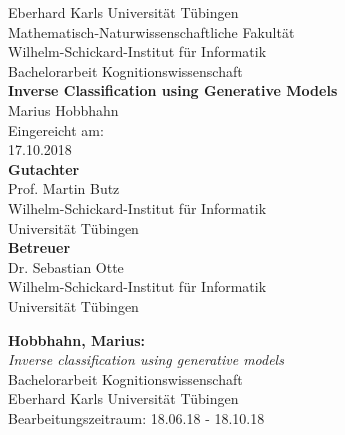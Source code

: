 



\begin{titlepage}

\begin{center}
	\LARGE Eberhard Karls Universität Tübingen\\
	\large Mathematisch-Naturwissenschaftliche Fakultät \\
	Wilhelm-Schickard-Institut für Informatik\\
	[3cm]
	\huge Bachelorarbeit Kognitionswissenschaft\\
	[2cm]
	\Large\textbf{Inverse Classification using Generative Models}\\
	[1.5cm]
	\large Marius Hobbhahn\\
	[0.5cm]
	Eingereicht am: \\
	17.10.2018\\
	\vfill
	\small\textbf{Gutachter}\\[0.3cm]
	\large Prof. Martin Butz\\
	\footnotesize Wilhelm-Schickard-Institut für Informatik\\Universität Tübingen\\
	[1cm]
	\small\textbf{Betreuer}\\[0.3cm]
	\large Dr. Sebastian Otte\\
	\footnotesize Wilhelm-Schickard-Institut für Informatik\\Universität Tübingen\\
\end{center}
\newpage
\thispagestyle{empty}
\vspace*{\fill}
\noindent
\textbf{Hobbhahn, Marius:}\\
\emph{Inverse classification using generative models}\\
Bachelorarbeit Kognitionswissenschaft\\
Eberhard Karls Universität Tübingen\\
Bearbeitungszeitraum: 18.06.18 - 18.10.18
%


\end{titlepage}
